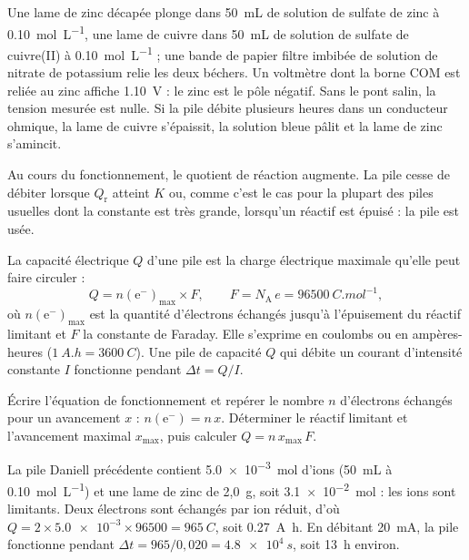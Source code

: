 \begin{experience}
Une lame de zinc décapée plonge dans 50~mL de solution de sulfate de zinc à \qty{0,10}{mol.L^{-1}}, une lame de cuivre
dans 50~mL de solution de sulfate de cuivre(II) à \qty{0,10}{mol.L^{-1}} ; une bande de papier filtre imbibée de solution
de nitrate de potassium relie les deux béchers. Un voltmètre dont la borne COM est reliée au zinc affiche \qty{1,10}{V} :
le zinc est le pôle négatif. Sans le pont salin, la tension mesurée est nulle. Si la pile débite plusieurs heures dans
un conducteur ohmique, la lame de cuivre s'épaissit, la solution bleue pâlit et la lame de zinc s'amincit.
\end{experience}
\begin{propriete}
Au cours du fonctionnement, le quotient de réaction augmente. La pile cesse de débiter lorsque $Q_\mathrm{r}$ atteint $K$
ou, comme c'est le cas pour la plupart des piles usuelles dont la constante est très grande, lorsqu'un réactif est
épuisé : la pile est usée.
\end{propriete}
\begin{definition}
La capacité électrique $Q$ d'une pile est la charge électrique maximale qu'elle peut faire circuler :
\[Q=n(\mathrm{e}^-)_{\max}\times F,\qquad F=N_\mathrm{A}\,e=\qty{96500}{C.mol^{-1}},\]
où $n(\mathrm{e}^-)_{\max}$ est la quantité d'électrons échangés jusqu'à l'épuisement du réactif limitant et $F$ la
constante de Faraday. Elle s'exprime en coulombs ou en ampères-heures ($\qty{1}{A.h}=\qty{3600}{C}$). Une pile de
capacité $Q$ qui débite un courant d'intensité constante $I$ fonctionne pendant $\Delta t=Q/I$.
\end{definition}
\begin{savoirfaire}
Écrire l'équation de fonctionnement et repérer le nombre $n$ d'électrons échangés pour un avancement $x$ :
$n(\mathrm{e}^-)=n\,x$. Déterminer le réactif limitant et l'avancement maximal $x_{\max}$, puis calculer $Q=n\,x_{\max}\,F$.
\end{savoirfaire}
\begin{exemple}
La pile Daniell précédente contient \qty{5,0e-3}{mol} d'ions  (50~mL à \qty{0,10}{mol.L^{-1}}) et une lame de
zinc de 2,0~g, soit \qty{3,1e-2}{mol} : les ions  sont limitants. Deux électrons sont échangés par ion 
réduit, d'où $Q=2\times\num{5.0e-3}\times\num{96500}=\qty{965}{C}$, soit \qty{0,27}{A.h}. En débitant \qty{20}{mA}, la pile
fonctionne pendant $\Delta t=965/0{,}020=\qty{4,8e4}{s}$, soit 13~h environ.
\end{exemple}
